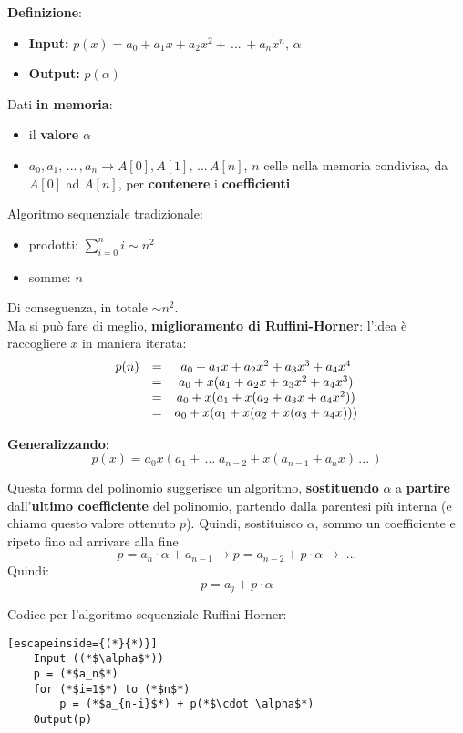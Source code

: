 \textbf{Definizione}:
\begin{itemize}
	\item \textbf{Input:} $p(x) = a_0 + a_1 x + a_2 x^2 + \, ... \, + a_n x^n$, $\alpha$
	\item \textbf{Output:} $p(\alpha)$
\end{itemize}

Dati \textbf{in memoria}: 
\begin{itemize}
	\item il \textbf{valore} $\alpha$
	\item $a_0, a_1, \, ... \, , a_n \rightarrow A[0], A[1], \, ... \, A[n]$, $n$ celle nella memoria condivisa, da $A[0]$ ad $A[n]$, per \textbf{contenere} i \textbf{coefficienti}
\end{itemize}

Algoritmo sequenziale tradizionale:
\begin{itemize}
	\item prodotti: $\sum_{i=0}^n i \sim n^2$
	\item somme: $n$
\end{itemize}
Di conseguenza, in totale $\sim n^2$.\\

Ma si può fare di meglio, \textbf{miglioramento di Ruffini-Horner}: l'idea è raccogliere $x$ in maniera iterata:
$$ \begin{array}{c c c}
	p(n) & = & a_0 + a_1 x + a_2 x^2 + a_3 x^3 + a_4 x^4 \\
	& = & a_0 + x (a_1 + a_2 x + a_3 x^2 + a_4 x^3) \\ 
	& = & a_0 + x (a_1 + x (a_2 + a_3 x + a_4 x^2)) \\
	& = & a_0 + x (a_1 + x (a_2 + x (a_3 + a_4 x))) \\
\end{array}$$

\textbf{Generalizzando}:
$$ p(x) = a_0 x(a_1 + \, ... \; a_{n-2} + x (a_{n-1} + a_n x) \, ... \,)$$

Questa forma del polinomio suggerisce un algoritmo, \textbf{sostituendo} $\alpha$ a \textbf{partire} dall'\textbf{ultimo coefficiente} del polinomio, partendo dalla parentesi più interna (e chiamo questo valore ottenuto $p$). Quindi, sostituisco $\alpha$, sommo un coefficiente e ripeto fino ad arrivare alla fine
$$ p = a_n \cdot \alpha + a_{n-1} \rightarrow p = a_{n-2} + p \cdot \alpha \rightarrow  \; ...$$
Quindi: 
$$ p = a_j + p \cdot \alpha $$

\newpage

Codice per l'algoritmo sequenziale Ruffini-Horner:
\begin{lstlisting}[escapeinside={(*}{*)}]
	Input ((*$\alpha$*))
	p = (*$a_n$*)
	for (*$i=1$*) to (*$n$*)
		p = (*$a_{n-i}$*) + p(*$\cdot \alpha$*)
	Output(p)
\end{lstlisting}

